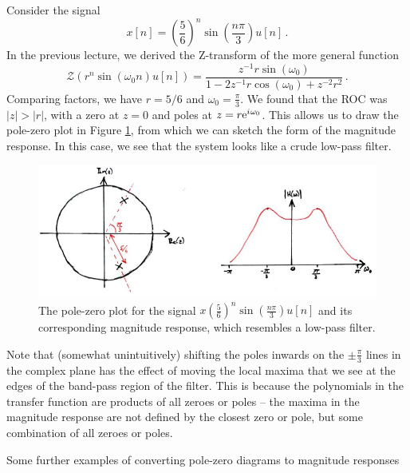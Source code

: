 \begin{exmp}
  Consider the signal
  \begin{displaymath}
    x[n] = \left(\frac{5}{6}\right)^n\sin\left(\frac{n\pi}{3}\right)u[n] \,.
  \end{displaymath}
  In the previous lecture, we derived the Z-transform of the more general function
  \begin{displaymath}
    \mathscr{Z}(r^n\sin(\omega_0 n)u[n]) = \frac{z^{-1}r\sin(\omega_0)}{1 - 2z^{-1}r\cos(\omega_0) + z^{-2}r^2} \,.
  \end{displaymath}
  Comparing factors, we have $r=5/6$ and $\omega_0=\frac{\pi}{3}$.
  We found that the ROC was $|z| > |r|$, with a zero at $z = 0$ and poles
  at $z = r\mathrm{e}^{{i\mkern1mu}\omega_0}$. This allows us to draw the pole-zero plot
  in Figure \ref{fig::lecture_9_poles_zeroes_example_1},
  from which we can sketch the form of the magnitude response.
  In this case, we see that the system looks like a crude low-pass filter.
  \begin{figure}[H]
    \includegraphics[width=\textwidth]{images/lecture_9_poles_zeroes_example_1.JPG}
    \caption{
      The pole-zero plot for the signal $x\left(\frac{5}{6}\right)^n\sin\left(\frac{n\pi}{3}\right)u[n]$
      and its corresponding magnitude response, which resembles a low-pass
      filter.
    }
    \label{fig::lecture_9_poles_zeroes_example_1}
  \end{figure}
  Note that (somewhat unintuitively) shifting the poles inwards on the
  $\pm\frac{\pi}{3}$ lines in the complex plane has the effect of moving
  the local maxima that we see at the edges of the band-pass region of the
  filter. This is because the polynomials in the transfer function are products
  of all zeroes or poles -- the maxima in the magnitude response
  are not defined by the closest zero or pole, but some combination of all
  zeroes or poles.
\end{exmp}
%
Some further examples of converting pole-zero diagrams to magnitude responses
